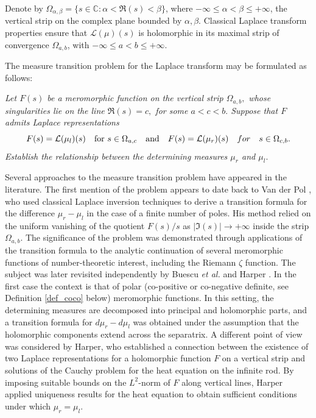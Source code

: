 \documentclass[12pt]{article}
\theoremstyle{definition}
\begin{document}
\noindent Denote by $\Omega_{\alpha,\beta}= \{ s \in \mathbb{C} : \alpha<\Re(s)<\beta  \}$,  where $- \infty \leq \alpha < \beta \leq + \infty$, the vertical strip on the complex plane bounded by $\alpha, \beta$. Classical Laplace transform properties  ensure that $\mathcal{L}(\mu)(s)$ 
is holomorphic in its maximal strip of convergence $\Omega_{a,b}$, with  $- \infty \leq a < b \leq + \infty$.

The measure transition problem for the Laplace transform may be formulated as follows:

\textit{Let $F(s)$ be a meromorphic function on the vertical strip $\Omega_{a,b},$ whose singularities lie on the line $\Re(s)=c,$ for some $a<c<b.$ Suppose that $F$ admits Laplace representations 
\[F(s)=\mathcal{L}(\mu_l)(s) \quad {\rm for} \ s \in \Omega_{a,c} \quad {\rm and}  \quad F(s)=\mathcal{L}(\mu_r)(s) \quad for \quad s \in \Omega_{c,b}.\]  
Establish the relationship between the determining measures $\mu_r$ and $\mu_l.$ }



Several approaches to the measure transition problem have appeared in the literature. 
The first mention of the problem appears to date back to Van der Pol \cite{VanderPol}, who used classical Laplace inversion techniques to derive a transition formula for the difference $\mu_r-\mu_l$ in the case of a finite number of poles. 
His method relied on the uniform vanishing of the quotient  \(F(s)/s\) as \(|\Im(s)| \to +\infty\) inside the strip $\Omega_{a,b}$. The significance of the problem was demonstrated through applications of the transition formula to the analytic continuation of several meromorphic functions of number-theoretic interest, including the Riemann $\zeta$ function.
The subject was later revisited independently by Buescu {\em et al.} \cite{BuescuReal, BuescuComplex, 
BuescuStrips, BuescuPolar, BuescuSpecial} and Harper \cite{Harper}. 
In the first case the context is that of polar (co-positive or co-negative definite, see Definition \ref{def_coco} below) meromorphic functions.
 In this setting, the determining measures are decomposed into principal and holomorphic parts, and a transition formula for $d\mu_r-d\mu_l$ was obtained under the assumption that the holomorphic components extend across the separatrix. 
A different point of view was considered by Harper,  who established a connection between the existence of two Laplace representations for a holomorphic function $F$ on a vertical strip and solutions of the Cauchy problem for the heat equation on the infinite rod. By imposing suitable bounds on the $L^2$-norm of $F$ along vertical lines, Harper applied uniqueness results for the heat equation to obtain sufficient conditions under which $\mu_r=\mu_l$.
\end{document}
